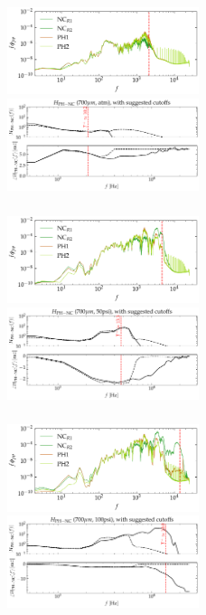 \documentclass[aspectratio=169,9pt]{beamer}
\begin{document}
\begin{frame}
  \frametitle{}
  \begin{figure}
    \centering
    \includegraphics[width=0.5\textwidth]{tf_calib/700_atm_calib_spec.png}
    \includegraphics[width=0.5\textwidth]{tf_calib/700_atm_H.pdf}
  \end{figure}
\end{frame}

\begin{frame}
  \frametitle{}
  \begin{figure}
    \centering
    \includegraphics[width=0.5\textwidth]{tf_calib/700_50psi_calib_spec.png}
    \includegraphics[width=0.5\textwidth]{tf_calib/700_50psi_H.pdf}
  \end{figure}
\end{frame}

\begin{frame}
  \frametitle{}
  \begin{figure}
    \centering
    \includegraphics[width=0.5\textwidth]{tf_calib/700_100psi_calib_spec.png}
    \includegraphics[width=0.5\textwidth]{tf_calib/700_100psi_H.pdf}
  \end{figure}
\end{frame}
\end{document}
